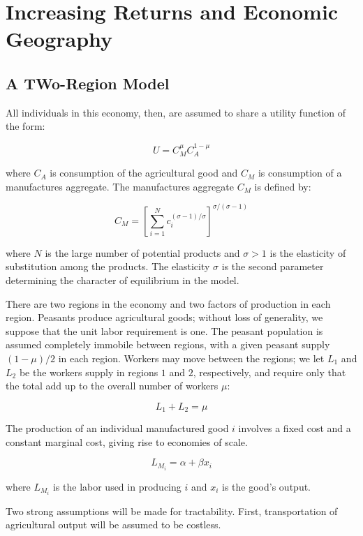\chapter{Increasing Returns and Economic Geography}

\section{A TWo-Region Model}

All individuals in this economy, then, are assumed to share a utility function of the form:

\begin{equation}
    U = C_M^{\mu} C_A^{1 - \mu}
\end{equation}

where $C_A$ is consumption of the agricultural good and $C_M$ is consumption of a manufactures aggregate. The manufactures aggregate $C_M$ is defined by:

\begin{equation}
    C_M = \left[ \sum_{i=1}^N c_i^{(\sigma - 1)/\sigma}\right]^{\sigma/(\sigma - 1)}
\end{equation}

where $N$ is the large number of potential products and $\sigma > 1$ is the elasticity of substitution among the products. The elasticity $\sigma$ is the second parameter determining the character of equilibrium in the model.

There are two regions in the economy and two factors of production in each region. Peasants produce agricultural goods; without loss of generality, we suppose that the unit labor requirement is one. The peasant population is assumed completely immobile between regions, with a given peasant supply $(1 - \mu) / 2$ in each region. Workers may move between the regions; we let $L_1$ and $L_2$ be the workers supply in regions $1$ and $2$, respectively, and require only that the total add up to the overall number of workers $\mu$:

\begin{equation}
    L_1 + L_2 = \mu
\end{equation}

The production of an individual manufactured good $i$ involves a fixed cost and a constant marginal cost, giving rise to economies of scale.

\begin{equation}
    L_{M_i} = \alpha + \beta x_i
\end{equation}

where $L_{M_i}$ is the labor used in producing $i$ and $x_i$ is the good's output.

Two strong assumptions will be made for tractability. First, transportation of agricultural output will be assumed to be costless.
